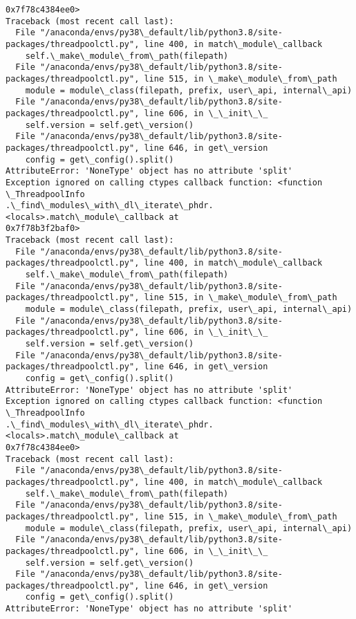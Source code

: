 \documentclass[11pt]{article}
\begin{document}
\begin{Verbatim}[commandchars=\\\{\}]
0x7f78c4384ee0>
Traceback (most recent call last):
  File "/anaconda/envs/py38\_default/lib/python3.8/site-
packages/threadpoolctl.py", line 400, in match\_module\_callback
    self.\_make\_module\_from\_path(filepath)
  File "/anaconda/envs/py38\_default/lib/python3.8/site-
packages/threadpoolctl.py", line 515, in \_make\_module\_from\_path
    module = module\_class(filepath, prefix, user\_api, internal\_api)
  File "/anaconda/envs/py38\_default/lib/python3.8/site-
packages/threadpoolctl.py", line 606, in \_\_init\_\_
    self.version = self.get\_version()
  File "/anaconda/envs/py38\_default/lib/python3.8/site-
packages/threadpoolctl.py", line 646, in get\_version
    config = get\_config().split()
AttributeError: 'NoneType' object has no attribute 'split'
Exception ignored on calling ctypes callback function: <function \_ThreadpoolInfo
.\_find\_modules\_with\_dl\_iterate\_phdr.<locals>.match\_module\_callback at
0x7f78b3f2baf0>
Traceback (most recent call last):
  File "/anaconda/envs/py38\_default/lib/python3.8/site-
packages/threadpoolctl.py", line 400, in match\_module\_callback
    self.\_make\_module\_from\_path(filepath)
  File "/anaconda/envs/py38\_default/lib/python3.8/site-
packages/threadpoolctl.py", line 515, in \_make\_module\_from\_path
    module = module\_class(filepath, prefix, user\_api, internal\_api)
  File "/anaconda/envs/py38\_default/lib/python3.8/site-
packages/threadpoolctl.py", line 606, in \_\_init\_\_
    self.version = self.get\_version()
  File "/anaconda/envs/py38\_default/lib/python3.8/site-
packages/threadpoolctl.py", line 646, in get\_version
    config = get\_config().split()
AttributeError: 'NoneType' object has no attribute 'split'
Exception ignored on calling ctypes callback function: <function \_ThreadpoolInfo
.\_find\_modules\_with\_dl\_iterate\_phdr.<locals>.match\_module\_callback at
0x7f78c4384ee0>
Traceback (most recent call last):
  File "/anaconda/envs/py38\_default/lib/python3.8/site-
packages/threadpoolctl.py", line 400, in match\_module\_callback
    self.\_make\_module\_from\_path(filepath)
  File "/anaconda/envs/py38\_default/lib/python3.8/site-
packages/threadpoolctl.py", line 515, in \_make\_module\_from\_path
    module = module\_class(filepath, prefix, user\_api, internal\_api)
  File "/anaconda/envs/py38\_default/lib/python3.8/site-
packages/threadpoolctl.py", line 606, in \_\_init\_\_
    self.version = self.get\_version()
  File "/anaconda/envs/py38\_default/lib/python3.8/site-
packages/threadpoolctl.py", line 646, in get\_version
    config = get\_config().split()
AttributeError: 'NoneType' object has no attribute 'split'

\end{Verbatim}
\end{document}
